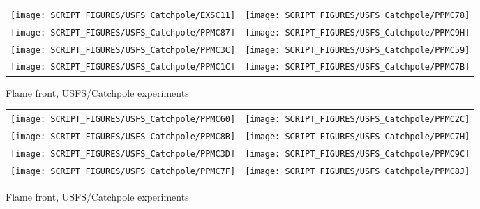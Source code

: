 \begin{figure}[p]
\begin{tabular*}{\textwidth}{l@{\extracolsep{\fill}}r}
\texttt{[image: SCRIPT\_FIGURES/USFS\_Catchpole/EXSC11]} &
\texttt{[image: SCRIPT\_FIGURES/USFS\_Catchpole/PPMC78]} \\
\texttt{[image: SCRIPT\_FIGURES/USFS\_Catchpole/PPMC87]} &
\texttt{[image: SCRIPT\_FIGURES/USFS\_Catchpole/PPMC9H]} \\
\texttt{[image: SCRIPT\_FIGURES/USFS\_Catchpole/PPMC3C]} &
\texttt{[image: SCRIPT\_FIGURES/USFS\_Catchpole/PPMC59]} \\
\texttt{[image: SCRIPT\_FIGURES/USFS\_Catchpole/PPMC1C]} &
\texttt{[image: SCRIPT\_FIGURES/USFS\_Catchpole/PPMC7B]} \\
\end{tabular*}
\caption[Flame front, USFS/Catchpole experiments]{Flame front, USFS/Catchpole experiments}
\label{USFS_Catchpole_168}
\end{figure}

\begin{figure}[p]
\begin{tabular*}{\textwidth}{l@{\extracolsep{\fill}}r}
\texttt{[image: SCRIPT\_FIGURES/USFS\_Catchpole/PPMC60]} &
\texttt{[image: SCRIPT\_FIGURES/USFS\_Catchpole/PPMC2C]} \\
\texttt{[image: SCRIPT\_FIGURES/USFS\_Catchpole/PPMC8B]} &
\texttt{[image: SCRIPT\_FIGURES/USFS\_Catchpole/PPMC7H]} \\
\texttt{[image: SCRIPT\_FIGURES/USFS\_Catchpole/PPMC3D]} &
\texttt{[image: SCRIPT\_FIGURES/USFS\_Catchpole/PPMC9C]} \\
\texttt{[image: SCRIPT\_FIGURES/USFS\_Catchpole/PPMC7F]} &
\texttt{[image: SCRIPT\_FIGURES/USFS\_Catchpole/PPMC8J]} \\
\end{tabular*}
\caption[Flame front, USFS/Catchpole experiments]{Flame front, USFS/Catchpole experiments}
\label{USFS_Catchpole_176}
\end{figure}

